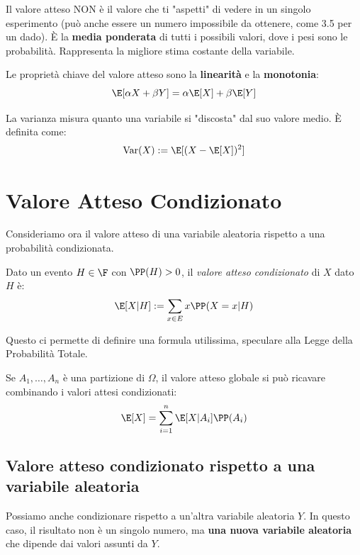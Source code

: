 \begin{spiegazione}
    Il valore atteso NON è il valore che ti "aspetti" di vedere in un singolo esperimento (può anche essere un numero impossibile da ottenere, come 3.5 per un dado). È la \textbf{media ponderata} di tutti i possibili valori, dove i pesi sono le probabilità. Rappresenta la migliore stima costante della variabile.
\end{spiegazione}

Le proprietà chiave del valore atteso sono la \textbf{linearità} e la \textbf{monotonia}:
\[ \E[\alpha X + \beta Y] = \alpha \E[X] + \beta \E[Y] \]

\begin{definition}[Varianza]
La varianza misura quanto una variabile si "discosta" dal suo valore medio. È definita come:
\[ \operatorname{Var}(X) := \E[(X - \E[X])^2] \]
\end{definition}

\section{Valore Atteso Condizionato}

Consideriamo ora il valore atteso di una variabile aleatoria rispetto a una probabilità condizionata.

\begin{definition}
Dato un evento $H \in \F$ con $\PP(H) > 0$, il \emph{valore atteso condizionato} di $X$ dato $H$ è:
\[ \E[X|H] := \sum_{x \in E} x \PP(X = x | H) \]
\end{definition}

Questo ci permette di definire una formula utilissima, speculare alla Legge della Probabilità Totale.

\begin{theorem}
Se $A_1, \dots, A_n$ è una partizione di $\Omega$, il valore atteso globale si può ricavare combinando i valori attesi condizionati:
\[ \E[X] = \sum_{i=1}^n \E[X|A_i] \PP(A_i) \]
\end{theorem}

\subsection{Valore atteso condizionato rispetto a una variabile aleatoria}

Possiamo anche condizionare rispetto a un'altra variabile aleatoria $Y$. In questo caso, il risultato non è un singolo numero, ma \textbf{una nuova variabile aleatoria} che dipende dai valori assunti da $Y$.

